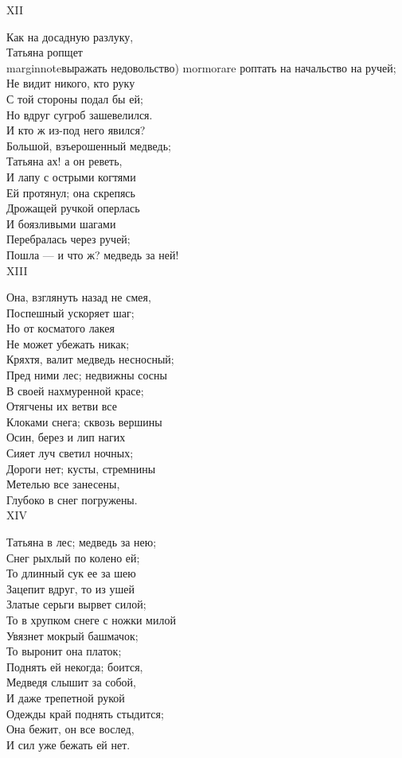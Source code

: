 XII

Как на досадную разлуку,\\
Татьяна ропщет\\marginnote{выражать недовольство) mormorare роптать на начальство} на ручей;\\
Не видит никого, кто руку\\
С той стороны подал бы ей;\\
Но вдруг сугроб зашевелился.\\
И кто ж из-под него явился?\\
Большой, взъерошенный медведь;\\
Татьяна ах! а он реветь,\\
И лапу с острыми когтями\\
Ей протянул; она скрепясь\\
Дрожащей ручкой оперлась\\
И боязливыми шагами\\
Перебралась через ручей;\\
Пошла — и что ж? медведь за ней!\\

XIII

Она, взглянуть назад не смея,\\
Поспешный ускоряет шаг;\\
Но от косматого лакея\\
Не может убежать никак;\\
Кряхтя, валит медведь несносный;\\
Пред ними лес; недвижны сосны\\
В своей нахмуренной красе;\\
Отягчены их ветви все\\
Клоками снега; сквозь вершины\\
Осин, берез и лип нагих\\
Сияет луч светил ночных;\\
Дороги нет; кусты, стремнины\\
Метелью все занесены,\\
Глубоко в снег погружены.\\

XIV

Татьяна в лес; медведь за нею;\\
Снег рыхлый по колено ей;\\
То длинный сук ее за шею\\
Зацепит вдруг, то из ушей\\
Златые серьги вырвет силой;\\
То в хрупком снеге с ножки милой\\
Увязнет мокрый башмачок;\\
То выронит она платок;\\
Поднять ей некогда; боится,\\
Медведя слышит за собой,\\
И даже трепетной рукой\\
Одежды край поднять стыдится;\\
Она бежит, он все вослед,\\
И сил уже бежать ей нет.\\

